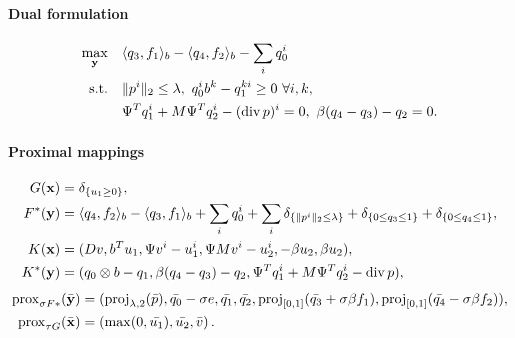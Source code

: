 \paragraph{Dual formulation}
\begin{align*}
    \max_{\mathbf{y}} \quad
        & \langle q_3, f_1 \rangle_b - \langle q_4, f_2 \rangle_b - \sum_i q_0^i  \\
    \text{s.t.}\quad
        & \|p^{i}\|_{2} \leq \lambda,
          ~q_0^i b^k - q_1^{ki} \geq 0 ~\forall i, k, \\
        & \Psi^T q_1^i + M \Psi^T q_2^i - (\operatorname{div} p)^i = 0,
          ~\beta (q_4 - q_3) - q_2 = 0.
\end{align*}

\paragraph{Proximal mappings}
\begin{align*}
    G(\mathbf{x}) &= \delta_{\{u_1 \geq 0\}}, \\
    F^*(\mathbf{y}) &= \langle q_4, f_2 \rangle_b - \langle q_3, f_1 \rangle_b
        + \sum_{i} q_0^i
        + \sum_{i} \delta_{\{\|p^{i}\|_{2} \leq \lambda\}}
        + \delta_{\{0 \leq q_3 \leq 1\}} + \delta_{\{0 \leq q_4 \leq 1\}}, \\
    K(\mathbf{x}) &= (
        Dv,
        b^T u_1,
        \Psi v^i - u_1^i,
        \Psi M v^i - u_2^i,
        -\beta u_2,
        \beta u_2
    ), \\
    K^*(\mathbf{y}) &= (
        q_0 \otimes b - q_1,
        \beta (q_4 - q_3) - q_2,
        \Psi^T q_1^i + M \Psi^T q_2^i - \operatorname{div}{p}
    ),
\end{align*}
\begin{align*}
    \operatorname{prox}_{\sigma F*}(\bar{\mathbf{y}})
    &= (
        \operatorname{proj}_{\lambda,2}(\bar{p}),
        \bar{q_0}-\sigma e,
        \bar{q_1},
        \bar{q_2},
        \operatorname{proj}_{[0,1]}(\bar{q_3} + \sigma \beta f_1),
        \operatorname{proj}_{[0,1]}(\bar{q_4} - \sigma \beta f_2)
   ), \\
    \operatorname{prox}_{\tau G}(\bar{\mathbf{x}})
    &= \left(
        \max(0,\bar{u_1}),
        \bar{u_2},
        \bar{v}
    \right).
\end{align*}
